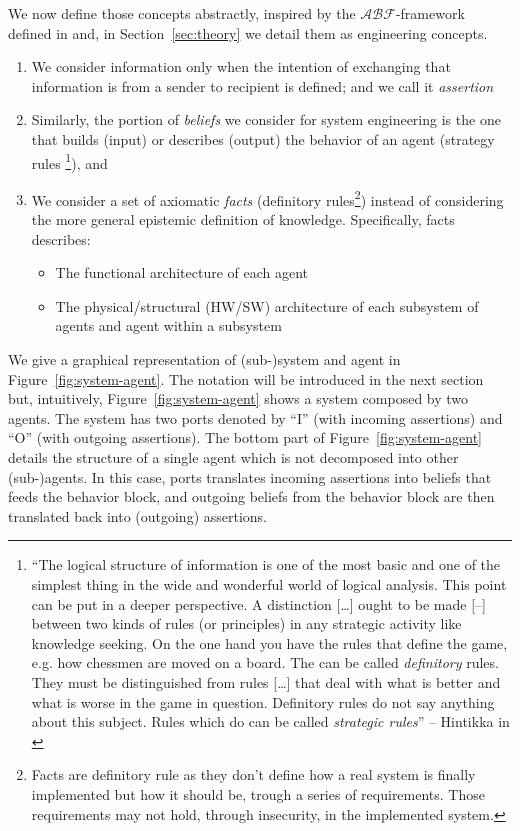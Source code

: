 \documentclass[conference]{IEEEtran}
\newcommand{\assertionRegion}{\mathcal{A}}
\newcommand{\beliefRegion}{\mathcal{B}}
\newcommand{\factRegion}{\mathcal{F}}
\newcommand{\abftheory}{\assertionRegion\beliefRegion\factRegion}
\begin{document}
We now define those concepts abstractly, inspired by the
$\abftheory$-framework  defined in \autocite{Santaca2016abf} and, in
Section~\ref{sec:theory} we detail them as engineering concepts.
\begin{enumerate}
	\item We consider information only when the intention of exchanging 
		that information is from a sender to 
		recipient is defined; and we call it \emph{assertion}  
	\item Similarly, the portion of \emph{beliefs} we consider for system
		engineering is the one that builds (input) or describes
		(output) the behavior of an agent (strategy rules
		\footnote{``The logical structure of information is one of the
		most basic and one of the simplest
		thing in the wide and wonderful world of logical analysis. This
		point can be put in a deeper perspective. A distinction
		[\ldots] ought to be made [--] between two kinds of rules (or
		principles) in any strategic activity like knowledge seeking.
		On the one hand you have the rules that define the game, e.g.
		how chessmen are moved on a board. The can be called
		\emph{definitory} rules.  They must be distinguished from rules
		[\ldots] that deal with what is better and what is worse in the
		game in question.  Definitory rules do not say anything about
		this subject. Rules which do can be called \emph{strategic
		rules}'' -- Hintikka in \autocite{Hintikka1993Information}}),
		and
	\item We consider a set of axiomatic \emph{facts} (definitory
		rules\footnote{Facts are definitory rule as they don't
		define how a real system is finally implemented but
		how it should be, trough a series of requirements. Those requirements 
		may not hold, through insecurity, in the implemented system.})
		instead of considering the more general epistemic definition of
		knowledge. Specifically, facts describes:
		\begin{itemize}
			\item The functional architecture of each agent
			\item The physical/structural (HW/SW) architecture of each
				subsystem of agents and agent within a
				subsystem
		\end{itemize}
\end{enumerate}
We give a graphical representation of (sub-)system and agent in Figure~\ref{fig:system-agent}.
The notation will be introduced in the next section but, intuitively,
Figure~\ref{fig:system-agent} shows a system composed by two agents. The system
has two ports denoted by ``I'' (with incoming assertions) and ``O'' (with outgoing assertions).
The bottom part of Figure~\ref{fig:system-agent} details the structure of a single
agent which is not decomposed into other (sub-)agents. In this case, ports translates
incoming assertions into beliefs that feeds the behavior block, and outgoing beliefs
from the behavior block are then translated back into (outgoing) assertions.
\end{document}
